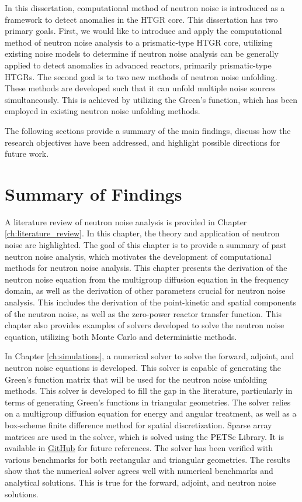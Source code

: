 \label{ch:conclusions}

In this dissertation, computational method of neutron noise is introduced as a framework to detect anomalies in the HTGR core. This dissertation has two primary goals. First, we would like to introduce and apply the computational method of neutron noise analysis to a prismatic-type HTGR core, utilizing existing noise models to determine if neutron noise analysis can be generally applied to detect anomalies in advanced reactors, primarily prismatic-type HTGRs. The second goal is to two new methods of neutron noise unfolding. These methods are developed such that it can unfold multiple noise sources simultaneously. This is achieved by utilizing the Green's function, which has been employed in existing neutron noise unfolding methods.

The following sections provide a summary of the main findings, discuss how the research objectives have been addressed, and highlight possible directions for future work.

\section{Summary of Findings}

A literature review of neutron noise analysis is provided in Chapter \ref{ch:literature_review}. In this chapter, the theory and application of neutron noise are highlighted. The goal of this chapter is to provide a summary of past neutron noise analysis, which motivates the development of computational methods for neutron noise analysis. This chapter presents the derivation of the neutron noise equation from the multigroup diffusion equation in the frequency domain, as well as the derivation of other parameters crucial for neutron noise analysis. This includes the derivation of the point-kinetic and spatial components of the neutron noise, as well as the zero-power reactor transfer function. This chapter also provides examples of solvers developed to solve the neutron noise equation, utilizing both Monte Carlo and deterministic methods.

In Chapter \ref{ch:simulations}, a numerical solver to solve the forward, adjoint, and neutron noise equations is developed. This solver is capable of generating the Green's function matrix that will be used for the neutron noise unfolding methods. This solver is developed to fill the gap in the literature, particularly in terms of generating Green's functions in triangular geometries. The solver relies on a multigroup diffusion equation for energy and angular treatment, as well as a box-scheme finite difference method for spatial discretization. Sparse array matrices are used in the solver, which is solved using the PETSc Library. It is available in \href{https://github.com/harunardi/FANGS-UNFOLD}{GitHub} for future references. The solver has been verified with various benchmarks for both rectangular and triangular geometries. The results show that the numerical solver agrees well with numerical benchmarks and analytical solutions. This is true for the forward, adjoint, and neutron noise solutions.

